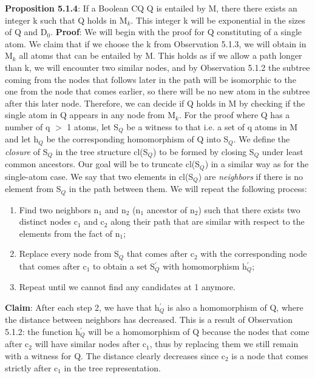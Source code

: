 \documentclass[11pt, a4paper, dvipsnames]{article}
\begin{document}
\textbf{Proposition 5.1.4}: If a Boolean CQ Q is entailed by M, there there exists an integer k such that Q holds in M$_{k}$. This integer k will be exponential in the sizes of Q and D$_{0}$.\newline
\textbf{Proof}: We will begin with the proof for Q constituting of a single atom. We claim that if we choose the k from Observation 5.1.3, we will obtain in M$_{k}$ all atoms that can be entailed by M. This holds as if we allow a path longer than k, we will encounter two similar nodes, and by Observation 5.1.2 the subtree coming from the nodes that follows later in the path will be isomorphic to the one from the node that comes earlier, so there will be no new atom in the subtree after this later node. Therefore, we can decide if Q holds in M by checking if the single atom in Q appears in any node from M$_{k}$.\newline
For the proof where Q has a number of q $>$ 1 atoms, let S$_{Q}$ be a witness to that i.e. a set of q atoms in M and let h$_{Q}$ be the corresponding homomorphism of Q into S$_{Q}$. We define the \textit{closure} of S$_{Q}$ in the tree structure cl(S$_{Q}$) to be formed by closing S$_{Q}$ under least common ancestors. Our goal will be to truncate cl(S$_{Q}$) in a similar way as for the single-atom case. We say that two elements in cl(S$_{Q}$) are \textit{neighbors} if there is no element from S$_{Q}$ in the path between them. We will repeat the following process:
\begin{enumerate}
	\item Find two neighbors n$_{1}$ and n$_{2}$ (n$_{1}$ ancestor of n$_{2}$) such that there exists two distinct nodes c$_{1}$ and c$_{2}$ along their path that are similar with respect to the elements from the fact of n$_{1}$;
	\item Replace every node from S$_{Q}$ that comes after c$_{2}$ with the corresponding node that comes after c$_{1}$ to obtain a set S$^{'}_{Q}$ with homomorphism h$^{'}_{Q}$;
	\item Repeat until we cannot find any candidates at 1 anymore.
\end{enumerate}
\textbf{Claim}: After each step 2, we have that h$^{'}_{Q}$ is also a homomorphism of Q, where the distance between neighbors has decreased.\newline
This is a result of Observation 5.1.2: the function h$^{'}_{Q}$ will be a homomorphism of Q because the nodes that come after c$_{2}$ will have similar nodes after c$_{1}$, thus by replacing them we still remain with a witness for Q. The distance clearly decreases since c$_{2}$ is a node that comes strictly after c$_{1}$ in the tree representation.
\end{document}
